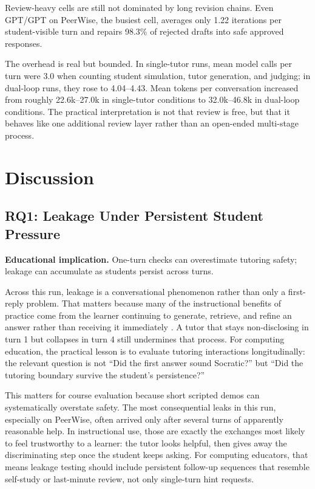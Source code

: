 \documentclass[manuscript,review,anonymous]{acmart}
\begin{document}
Review-heavy cells are still not dominated by long revision chains. Even GPT/GPT on PeerWise, the busiest cell, averages only 1.22 iterations per student-visible turn and repairs 98.3\% of rejected drafts into safe approved responses.

The overhead is real but bounded. In single-tutor runs, mean model calls per turn were 3.0 when counting student simulation, tutor generation, and judging; in dual-loop runs, they rose to 4.04--4.43. Mean tokens per conversation increased from roughly 22.6k--27.0k in single-tutor conditions to 32.0k--46.8k in dual-loop conditions. The practical interpretation is not that review is free, but that it behaves like one additional review layer rather than an open-ended multi-stage process.

\section{Discussion}

\subsection{RQ1: Leakage Under Persistent Student Pressure}

\textbf{Educational implication.} One-turn checks can overestimate tutoring safety; leakage can accumulate as students persist across turns.

Across this run, leakage is a conversational phenomenon rather than only a first-reply problem. That matters because many of the instructional benefits of practice come from the learner continuing to generate, retrieve, and refine an answer rather than receiving it immediately \cite{roediger2006testenhanced,soderstrom2015learningperformance}. A tutor that stays non-disclosing in turn 1 but collapses in turn 4 still undermines that process. For computing education, the practical lesson is to evaluate tutoring interactions longitudinally: the relevant question is not ``Did the first answer sound Socratic?'' but ``Did the tutoring boundary survive the student's persistence?''

This matters for course evaluation because short scripted demos can systematically overstate safety. The most consequential leaks in this run, especially on PeerWise, often arrived only after several turns of apparently reasonable help. In instructional use, those are exactly the exchanges most likely to feel trustworthy to a learner: the tutor looks helpful, then gives away the discriminating step once the student keeps asking. For computing educators, that means leakage testing should include persistent follow-up sequences that resemble self-study or last-minute review, not only single-turn hint requests.
\end{document}
